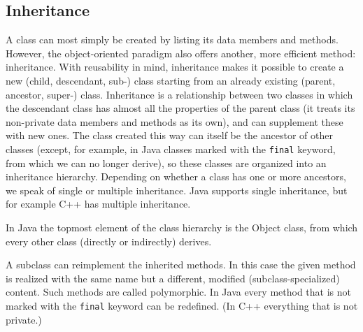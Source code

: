 \documentclass[margin=0px]{article}
\begin{document}
\subsection{Inheritance}

A class can most simply be created by listing its data members and methods. However, the object-oriented paradigm also offers another, more efficient method: inheritance. With reusability in mind, inheritance makes it possible to create a new (child, descendant, sub-) class starting from an already existing (parent, ancestor, super-) class. Inheritance is a relationship between two classes in which the descendant class has almost all the properties of the parent class (it treats its non-private data members and methods as its own), and can supplement these with new ones. The class created this way can itself be the ancestor of other classes (except, for example, in Java classes marked with the \texttt{final} keyword, from which we can no longer derive), so these classes are organized into an inheritance hierarchy. Depending on whether a class has one or more ancestors, we speak of single or multiple inheritance. Java supports single inheritance, but for example C++ has multiple inheritance.

In Java the topmost element of the class hierarchy is the Object class, from which every other class (directly or indirectly) derives.

A subclass can reimplement the inherited methods. In this case the given method is realized with the same name but a different, modified (subclass-specialized) content. Such methods are called polymorphic. In Java every method that is not marked with the \texttt{final} keyword can be redefined. (In C++ everything that is not private.)\\
\end{document}
